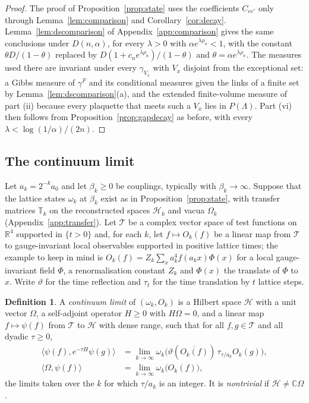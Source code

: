 \documentclass[11pt]{amsart}
\theoremstyle{definition}
\newtheorem{definition}[theorem]{Definition}
\theoremstyle{remark}
\numberwithin{equation}{section}
\newcommand{\R}{\mathbb{R}}
\newcommand{\C}{\mathbb{C}}
\newcommand{\ip}[2]{\langle #1,#2\rangle}
\begin{document}
\begin{proof}
The proof of Proposition~\ref{prop:state} uses the coefficients $C_{ee'}$
only through Lemma~\ref{lem:comparison} and Corollary~\ref{cor:decay}.
Lemma~\ref{lem:dscomparison} of Appendix~\ref{app:comparison} gives the same
conclusions under $D(n,\alpha)$, for every $\lambda>0$ with $\alpha
e^{\lambda\rho_n}<1$, with the constant $\theta D/(1-\theta)$ replaced by
$D(1+c_ne^{\lambda\rho_n})/(1-\theta)$ and $\theta=\alpha e^{\lambda\rho_n}$.
The measures used there are invariant under every $\gamma_{V_x}$ with $V_x$
disjoint from the exceptional set: a Gibbs measure of $\gamma^F$ and its
conditional measures given the links of a finite set by
Lemma~\ref{lem:dscomparison}(a), and the extended finite-volume measure of
part (ii) because every plaquette that meets such a $V_x$ lies in
$P(\Lambda)$. Part (vi) then follows from Proposition~\ref{prop:gapdecay}
as before, with every $\lambda<\log(1/\alpha)/(2n)$.
\end{proof}

\subsection{The continuum limit}

Let $a_k=2^{-k}a_0$ and let $\beta_k\ge0$ be couplings, typically with
$\beta_k\to\infty$. Suppose that the lattice states $\omega_k$ at $\beta_k$
exist as in Proposition~\ref{prop:state}, with transfer matrices $\mathbb T_k$ on
the reconstructed spaces $\mathcal H_k$ and vacua $\Omega_k$
(Appendix~\ref{app:transfer}). Let $\mathcal T$
be a complex vector space of test functions on $\R^4$ supported in $\{t>0\}$
and, for each $k$, let $f\mapsto O_k(f)$ be a linear map from $\mathcal T$ to
gauge-invariant local observables supported in positive lattice times; the
example to keep in mind is $O_k(f)=Z_k\sum_xa_k^4f(a_kx)\Phi(x)$ for a local
gauge-invariant field $\Phi$, a renormalisation constant $Z_k$ and $\Phi(x)$
the translate of $\Phi$ to $x$. Write $\vartheta$ for the time reflection and
$\tau_t$ for the time translation by $t$ lattice steps.

\begin{definition}\label{def:limit}
A \emph{continuum limit} of $(\omega_k,O_k)$ is a Hilbert space $\mathcal H$
with a unit vector $\Omega$, a self-adjoint operator $H\ge0$ with
$H\Omega=0$, and a linear map $f\mapsto\psi(f)$ from $\mathcal T$ to
$\mathcal H$ with dense range, such that for all $f,g\in\mathcal T$ and all
dyadic $\tau\ge0$,
\[
\begin{split}
\ip{\psi(f)}{e^{-\tau H}\psi(g)}&=\lim_{k\to\infty}\omega_k\bigl(\vartheta
(\overline{O_k(f)})\,\tau_{\tau/a_k}O_k(g)\bigr),\\
\ip\Omega{\psi(f)}&=\lim_{k\to\infty}\omega_k\bigl(O_k(f)\bigr),
\end{split}
\]
the limits taken over the $k$ for which $\tau/a_k$ is an integer. It is
\emph{nontrivial} if $\mathcal H\ne\C\Omega$.
\end{definition}
\end{document}
